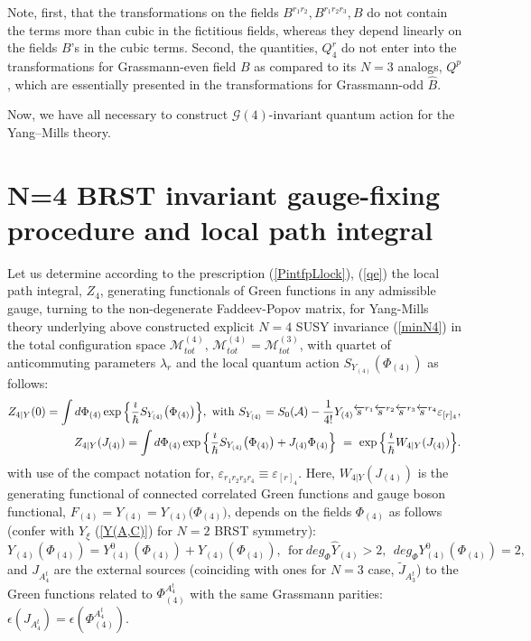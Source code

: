 \documentclass[10pt]{article}
\begin{document}
Note, first, that the  transformations on the fields $B^{r_1r_2}, B^{r_1r_2r_3}, B$ do not contain the terms more than cubic in the fictitious fields, whereas they  depend linearly on the fields $B$'s in the  cubic terms. Second, the quantities, $Q^{r}_4$ do not enter into the transformations for Grassmann-even field $B$ as compared  to its  $N=3$ analogs, $Q^{p}$, which are essentially presented  in the transformations for Grassmann-odd  $\widehat{B}$.

Now, we have all necessary to  construct  $\mathcal{G}(4)$-invariant  quantum action for the Yang--Mills theory.

\section{N=4  BRST invariant gauge-fixing procedure and local path integral }\label{N4gf}
 \setcounter{equation}{0}


Let us determine according to the prescription (\ref{PintfpLlock}), (\ref{qe})  the local   path integral, ${Z}_{4}$,  generating functionals of Green functions in any admissible gauge, turning to the non-degenerate Faddeev-Popov matrix, for Yang-Mills theory underlying above constructed explicit  $N=4$ SUSY invariance (\ref{minN4})  in the total configuration space $\mathcal{M}^{(4)}_{tot}$, $\mathcal{M}^{(4)}_{tot}=\mathcal{M}^{(3)}_{tot}$, with quartet of anticommuting parameters $\lambda_r$  and the local  quantum action $S_{Y_{(4)}}(\Phi_{(4)})$  as follows:
\begin{eqnarray}
\label{Pintlocn4}
  &\hspace{-1em}& {Z}_{4|Y}(0) =  \int  d \Phi_{(4)}   \exp \Big\{\frac{\imath}{\hbar}S_{Y_{(4)}}\big(\Phi_{(4)}\big)\Big\}, \ \mathrm{with}  \ S_{Y_{(4)}}  = S_0(\mathcal{A}) -\frac{1}{4!}%
Y_{(4)}\overleftarrow{s}{}^{r_1}\overleftarrow{s}{}^{r_2}\overleftarrow{s}{}^{r_3}\overleftarrow{s}{}^{r_4} \varepsilon_{[r]_4},\\
\label{GFlocn4}
  &\hspace{-1em}& {Z}_{4|Y}({J}_{(4)}) =  \int  d \Phi_{(4)}  \exp \Big\{\frac{\imath}{\hbar}S_{Y_{(4)}}\big(\Phi_{(4)}\big) + J_{(4)}\Phi_{(4)}\Big\} \ =\ \exp \Big\{\frac{\imath}{\hbar}W_{4|Y}({J}_{(4)})\Big\}.  \end{eqnarray}
with  use of the compact notation  for, $\varepsilon_{r_1r_2r_3r_4} \equiv \varepsilon_{[r]_4}$. Here, $W_{4|Y}({J}_{(4)})$ is  the generating functional of connected correlated Green functions  and  gauge boson functional, $F_{(4)} = Y_{(4)}=Y_{(4)}\big({\Phi}_{(4)}\big)$, depends on the fields ${\Phi}_{(4)}$ as follows (confer with  $Y_{\xi }$ (\ref{Y(A,C)}) for $N=2$ BRST symmetry):
\begin{equation}\label{N4gaugeb}
  Y_{(4)}({\Phi}_{(4)}) =    Y^0_{(4)}({\Phi}_{(4)})  +  \widehat{Y}_{(4)}({\Phi}_{(4)}), \   \ \mathrm{for} \ deg_{{\Phi}}\widehat{Y}_{(4)}>2, \ \ deg_{\Phi}{} Y^0_{(4)}({\Phi}_{(4)})  = 2,
\end{equation}
and ${J}_{A^t_4}$ are the  external sources  (coinciding with ones for $N=3$ case, $\widetilde{J}_{A^t_3}$)  to the  Green functions related to  $\Phi^{A^t_4}_{(4)}$ with the same Grassmann parities: $\epsilon(J_{A^t_4}) = \epsilon(\Phi^{A^t_4}_{(4)})$.
\end{document}
